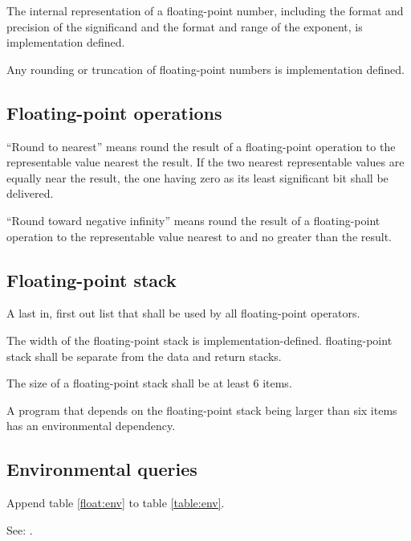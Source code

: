The internal representation of a floating-point number, including the
format and precision of the significand and the format and range of
the exponent, is implementation defined.

Any rounding or truncation of floating-point numbers is implementation
defined.

\subsection{Floating-point operations} %
\label{float:ops}

``Round to nearest'' means round the result of a floating-point
operation to the representable value nearest the result. If the two
nearest representable values are equally near the result, the one
having zero as its least significant bit shall be delivered.

``Round toward negative infinity'' means round the result of a
floating-point operation to the representable value nearest to and
no greater than the result.

\subsection{Floating-point stack} %
\label{float:stack}

A last in, first out list that shall be used by all floating-point
operators.

The width of the floating-point stack is implementation-defined.
 floating-point stack
shall be separate from the data and return stacks.

The size of a floating-point stack shall be at least 6 items.

A program that depends on the floating-point stack being larger than
six items has an environmental dependency.

\subsection{Environmental queries} %

Append table \ref{float:env} to table \ref{table:env}.

See: .

